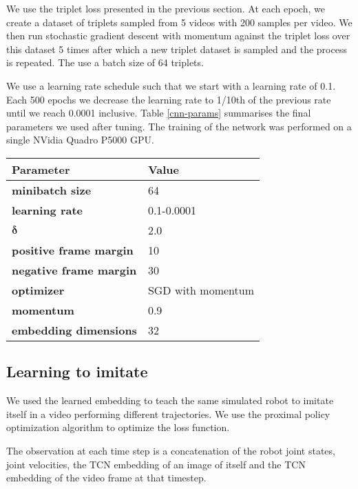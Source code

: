 We use the triplet loss presented in the previous section. At each epoch, we create a dataset of triplets sampled from 5 videos with 200 samples per video. We then run stochastic gradient descent with momentum against the triplet loss over this dataset 5 times after which a new triplet dataset is sampled and the process is repeated. The use a batch size of 64 triplets.

We use a learning rate schedule such that we start with a learning rate of 0.1. Each 500 epochs we decrease the learning rate to 1/10th of the previous rate until we reach 0.0001 inclusive. Table \ref{cnn-params} summarises the final parameters we used after tuning. The training of the network was performed on a single NVidia Quadro P5000 GPU.

{
    \vspace{0.5cm}
    \centering
    \begin{tabular}{@{}ll@{}}
    \toprule
    \textbf{Parameter}             & \textbf{Value}    \\ \midrule
    \textbf{minibatch size}        & 64                \\
    \textbf{learning rate}         & 0.1-0.0001        \\
    $\boldsymbol{\delta}$                & 2.0               \\
    \textbf{positive frame margin} & 10                \\
    \textbf{negative frame margin} & 30                \\
    \textbf{optimizer}             & SGD with momentum \\
    \textbf{momentum}              & 0.9               \\
    \textbf{embedding dimensions}  & 32
    \end{tabular}
    \label{cnn-params}
}

\subsection{Learning to imitate}

We used the learned embedding to teach the same simulated robot to imitate itself in a video performing different trajectories. We use the proximal policy optimization algorithm to optimize the loss function.

The observation at each time step is a concatenation of the robot joint states, joint velocities, the TCN embedding of an image of itself and the TCN embedding of the video frame at that timestep.

